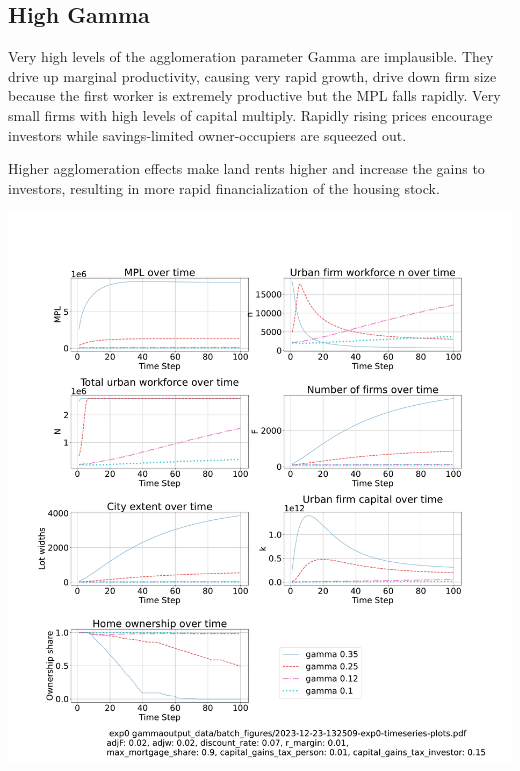 \documentclass{article}
\begin{document}
\newpage %

\subsection{High Gamma}
Very high levels of the agglomeration parameter Gamma are implausible. They drive up marginal productivity, causing very rapid growth, drive down firm size because the first worker is extremely productive but the MPL falls rapidly. Very small firms with high levels of capital multiply. Rapidly rising prices encourage investors while savings-limited owner-occupiers are squeezed out.

Higher agglomeration effects  make land rents higher and increase the gains to investors, resulting in more rapid financialization of the housing stock.

 

 \hspace*{-2.5cm}\includegraphics[trim= 1.5cm 3.65cm 2cm 4.0cm, clip, scale=.28]{fig/Analysis/Gamma-5-30.pdf}
\end{document}
